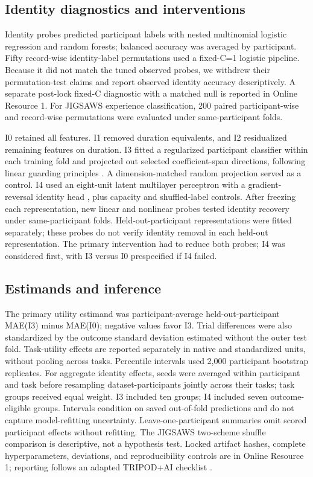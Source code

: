 \documentclass[11pt]{article}
\begin{document}
\subsection{Identity diagnostics and
interventions}\label{identity-diagnostics-and-interventions}

Identity probes predicted participant labels with nested multinomial
logistic regression and random forests; balanced accuracy was averaged
by participant. Fifty record-wise identity-label permutations used a
fixed-C=1 logistic pipeline. Because it did not match the tuned observed
probes, we withdrew their permutation-test claims and report observed
identity accuracy descriptively. A separate post-lock fixed-C diagnostic
with a matched null is reported in Online Resource 1. For JIGSAWS
experience classification, 200 paired participant-wise and record-wise
permutations were evaluated under same-participant folds.

I0 retained all features. I1 removed duration equivalents, and I2
residualized remaining features on duration. I3 fitted a regularized
participant classifier within each training fold and projected out
selected coefficient-span directions, following linear guarding
principles \citep{Ravfogel2020}. A dimension-matched random projection
served as a control. I4 used an eight-unit latent multilayer perceptron
with a gradient-reversal identity head \citep{Ganin2016}, plus capacity
and shuffled-label controls. After freezing each representation, new
linear and nonlinear probes tested identity recovery under
same-participant folds. Held-out-participant representations were fitted
separately; these probes do not verify identity removal in each held-out
representation. The primary intervention had to reduce both probes; I4
was considered first, with I3 versus I0 prespecified if I4 failed.

\subsection{Estimands and inference}\label{estimands-and-inference}

The primary utility estimand was participant-average
held-out-participant MAE(I3) minus MAE(I0); negative values favor I3.
Trial differences were also standardized by the outcome standard
deviation estimated without the outer test fold. Task-utility effects
are reported separately in native and standardized units, without
pooling across tasks. Percentile intervals used 2,000 participant
bootstrap replicates. For aggregate identity effects, seeds were
averaged within participant and task before resampling
dataset-participants jointly across their tasks; task groups received
equal weight. I3 included ten groups; I4 included seven outcome-eligible
groups. Intervals condition on saved out-of-fold predictions and do not
capture model-refitting uncertainty. Leave-one-participant summaries
omit scored participant effects without refitting. The JIGSAWS
two-scheme shuffle comparison is descriptive, not a hypothesis test.
Locked artifact hashes, complete hyperparameters, deviations, and
reproducibility controls are in Online Resource 1; reporting follows an
adapted TRIPOD+AI checklist \citep{Collins2024}.
\end{document}

